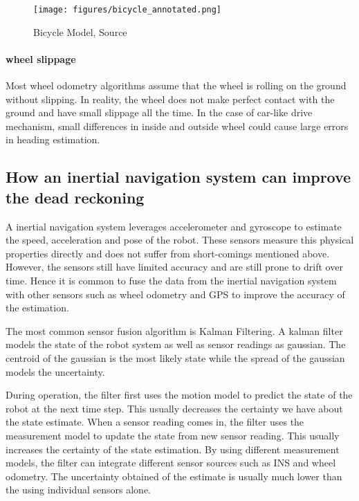 \documentclass{report}
\begin{document}
\begin{figure}
    \centering
    \texttt{[image: figures/bicycle\_annotated.png]}
    \caption{Bicycle Model, Source \cite{BicycleVehicleModel}}
    \label{fig:bicycle_model}
\end{figure}

\paragraph*{wheel slippage}

Most wheel odometry algorithms assume that the wheel is rolling on the ground without slipping. In reality, the wheel does not make perfect contact with the ground and have small slippage all the time. In the case of car-like drive mechanism, small differences in inside and outside wheel could cause large errors in heading estimation.

\subsection{How an inertial navigation system can improve the dead reckoning}

A inertial navigation system leverages accelerometer and gyroscope to estimate the speed, acceleration and pose of the robot. These sensors measure this physical properties directly and does not suffer from short-comings mentioned above. However, the sensors still have limited accuracy and are still prone to drift over time. Hence it is common to fuse the data from the inertial navigation system with other sensors such as wheel odometry and GPS to improve the accuracy of the estimation.

The most common sensor fusion algorithm is Kalman Filtering. A kalman filter models the state of the robot system as well as sensor readings as gaussian. The centroid of the gaussian is the most likely state while the spread of the gaussian models the uncertainty.

During operation, the filter first uses the motion model to predict the state of the robot at the next time step. This usually decreases the certainty we have about the state estimate. When a sensor reading comes in, the filter uses the measurement model to update the state from new sensor reading. This usually increases the certainty of the state estimation. By using different measurement models, the filter can integrate different sensor sources such as INS and wheel odometry. The uncertainty obtained of the estimate is usually much lower than the using individual sensors alone.
\end{document}
